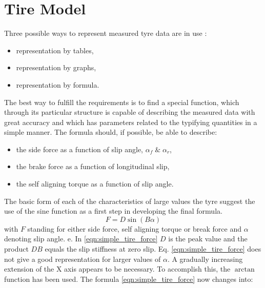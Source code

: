 \documentclass[12pt]{article}
\begin{document}
\section{Tire Model} \label{Tire_Model}
\par Three possible ways to represent measured tyre data are in use \cite{Bakker1987}:
\begin{itemize}
	\item representation by tables,
	\item representation by graphs,
	\item representation by formula.
\end{itemize}
\par The best way to fulfill the requirements is to find a special function, which through its particular structure is capable of describing the measured data with great accuracy and which has parameters related to the typifying quantities in a simple manner. The formula should, if possible, be able to
describe:
\begin{itemize}
	\item  the side force as a function of slip angle, $\alpha_f\;\& \;\alpha_r$,
	\item  the brake force as a function of longitudinal slip,
	\item the self aligning torque as a function of slip angle.
\end{itemize}
\par The basic form of each of the characteristics of large values the tyre  suggest the use of the sine function as a first step in developing the final formula.
\begin{equation}
\label{eqn:simple_tire_force}
F = D\sin(B\alpha)
\end{equation}
with $F$ standing for either side force, self aligning torque or break force and $\alpha$ denoting slip angle. e. In \ref{eqn:simple_tire_force} $D$ is the peak value and
the product $DB$ equals the slip stiffness at zero
slip. Eq. \ref{eqn:simple_tire_force} does not give a good representation for larger values of $\alpha$. A gradually increasing extension of the X axis appears to be necessary. To accomplish this, the $\arctan$ function has been used. The formula \ref{eqn:simple_tire_force} now changes into:
\end{document}
